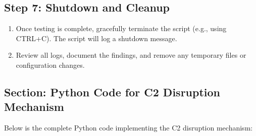 \documentclass{article}
\begin{document}
\subsection{Step 7: Shutdown and Cleanup}
\begin{enumerate}
    \item Once testing is complete, gracefully terminate the script (e.g., using CTRL+C). The script will log a shutdown message.
    \item Review all logs, document the findings, and remove any temporary files or configuration changes.
\end{enumerate}

\subsection{Section: Python Code for C2 Disruption Mechanism}
\label{sec:python_code}
Below is the complete Python code implementing the C2 disruption mechanism:
\end{document}
